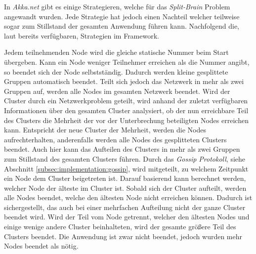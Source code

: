 % 
In \textit{Akka.net} gibt es einige Strategieren, welche für das \textit{Split-Brain} Problem angewandt wurden. Jede Strategie hat jedoch einen Nachteil welcher teilweise sogar zum Stillstand der gesamten Anwendung führen kann. Nachfolgend die, laut \cite{Akka.netCommunityAkka.NETDocumentation} bereits verfügbaren, Strategien im Framework.
% 
% 
\begin{itemize}
    Jedem teilnehmenden Node wird die gleiche statische Nummer beim Start übergeben. Kann ein Node weniger Teilnehmer erreichen als die Nummer angibt, so beendet sich der Node selbstständig. Dadurch werden kleine gesplittete Gruppen automatisch beendet. Teilt sich jedoch das Netzwerk in mehr als zwei Gruppen auf, werden alle Nodes im gesamten Netzwerk beendet. 
    Wird der Cluster durch ein Netzwerkproblem geteilt, wird anhand der zuletzt verfügbaren Informationen über den gesamten Cluster analysiert, ob der nun erreichbare Teil des Clusters die Mehrheit der vor der Unterbrechung  beteiligten Nodes  erreichen kann. Entspricht der neue Cluster der Mehrheit, werden die Nodes aufrechterhalten, anderenfalls werden alle Nodes des gesplitteten Clusters beendet. Auch hier kann das Aufteilen des Clusters in mehr als zwei Gruppen zum Stillstand des gesamten Clusters führen.
    Durch das \textit{Gossip Protokoll}, siehe Abschnitt \ref{subsec:implementation:gossip}, wird  mitgeteilt, zu welchem Zeitpunkt ein Node dem Cluster beigetreten ist. Darauf basierend kann berechnet werden, welcher Node der älteste im Cluster ist. Sobald sich der Cluster aufteilt, werden alle Nodes beendet, welche den ältesten Node nicht erreichen können. Dadurch ist sichergestellt, das auch bei einer mehrfachen Aufteilung nicht der ganze Cluster beendet wird. Wird der Teil vom Node getrennt, welcher den ältesten Nodes und einige wenige andere Cluster beinhalteten, wird der gesamte größere Teil des Clusters beendet. Die Anwendung ist zwar nicht beendet, jedoch wurden mehr Nodes beendet als nötig. 
% 
% 


\end{itemize}
